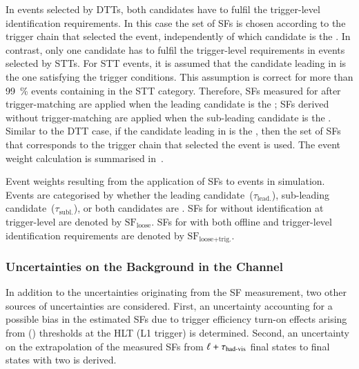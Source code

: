 In events selected by DTTs, both \tauhadvis candidates have to fulfil the
trigger-level identification requirements. In this case the set of SFs is chosen
according to the trigger chain that selected the event, independently of which
\tauhadvis candidate is the \faketauhadvis. In contrast, only one \tauhadvis
candidate has to fulfil the trigger-level requirements in events selected by
STTs. For STT events, it is assumed that the \tauhadvis candidate leading in \pT
is the one satisfying the trigger conditions. This assumption is correct for
more than \SI{99}{\percent} \ttbar events containing \faketauhadvis in the STT
category. Therefore, SFs measured for \faketauhadvis after trigger-matching are
applied when the leading \tauhadvis candidate is the \faketauhadvis; SFs derived
without trigger-matching are applied when the sub-leading \tauhadvis candidate
is the \faketauhadvis. Similar to the DTT case, if the \tauhadvis candidate
leading in \pT is the \faketauhadvis, then the set of SFs that corresponds to
the trigger chain that selected the event is used. The event weight calculation
is summarised in~.

\begin{table}[htbp]
  \centering

  \caption{Event weights resulting from the application of SFs to \ttbarFakes
    events in simulation. Events are categorised by whether the leading
    \tauhadvis candidate~($\tau_{\text{lead.}}$), sub-leading \tauhadvis
    candidate~($\tau_{\text{subl.}}$), or both \tauhadvis candidates are
    \faketauhadvis. SFs for \faketauhadvis without identification at
    trigger-level are denoted by $\text{SF}_{\text{loose}}$. SFs for
    \faketauhadvis with both offline and trigger-level identification
    requirements are denoted by $\text{SF}_\text{loose+trig.}$.}%
  \label{tab:ttbarSF_application_rule}

  \resizebox{\textwidth}{!}{
    
  }
\end{table}


\subsubsection{Uncertainties on the \ttbarFakes Background in the \hadhad
  Channel}

In addition to the uncertainties originating from the SF measurement, two other
sources of uncertainties are considered. First, an uncertainty accounting for a
possible bias in the estimated SFs due to trigger efficiency turn-on effects
arising from \tauhadvis \pT (\ET) thresholds at the HLT (L1 trigger) is
determined. Second, an uncertainty on the extrapolation of the measured SFs from
$\ell + \tau_{\text{had-vis}}$ final states to final states with two \tauhadvis is derived.

